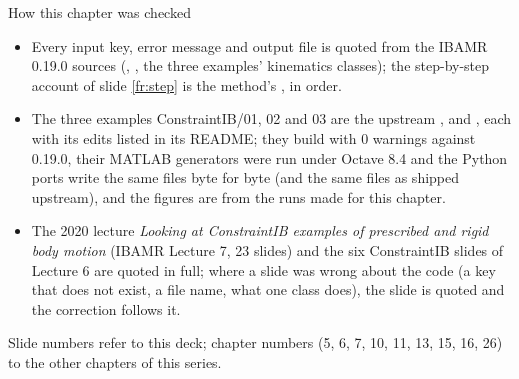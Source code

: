 \documentclass[aspectratio=169,11pt]{beamer}
\begin{document}
\begin{frame}{How this chapter was checked}
\label{fr:checked}
\begin{itemize}\footnotesize
  \item Every input key, error message and output file is quoted from the IBAMR 0.19.0 sources (, , the three examples' kinematics classes); the step-by-step account of slide \ref{fr:step} is the method's , in order.
  \item The three examples ConstraintIB/01, 02 and 03 are the upstream ,  and , each with its edits listed in its README; they build with 0 warnings against 0.19.0, their MATLAB generators were run under Octave 8.4 and the Python ports write the same files byte for byte (and the same files as shipped upstream), and the figures are from the runs made for this chapter.
  \item The 2020 lecture \emph{Looking at ConstraintIB examples of prescribed and rigid body motion} (IBAMR Lecture 7, 23 slides) and the six ConstraintIB slides of Lecture 6 are quoted in full; where a slide was wrong about the code (a key that does not exist, a file name, what one class does), the slide is quoted and the correction follows it.
\end{itemize}
\begin{punchbox}
\footnotesize Slide numbers refer to this deck; chapter numbers (5, 6, 7, 10, 11, 13, 15, 16, 26) to the other chapters of this series.
\end{punchbox}
\end{frame}
\end{document}
